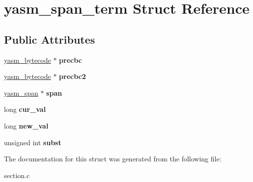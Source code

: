 \hypertarget{structyasm__span__term}{\section{yasm\-\_\-span\-\_\-term Struct Reference}
\label{structyasm__span__term}
}
\subsection*{Public Attributes}
\begin{DoxyCompactItemize}
\item 
\hypertarget{structyasm__span__term_a035f0ab04246f78579bd5672e381a8a3}{\hyperlink{structyasm__bytecode}{yasm\-\_\-bytecode} $\ast$ {\bfseries precbc}}\label{structyasm__span__term_a035f0ab04246f78579bd5672e381a8a3}

\item 
\hypertarget{structyasm__span__term_af9f81cf28035ac6cbf61603e44002f26}{\hyperlink{structyasm__bytecode}{yasm\-\_\-bytecode} $\ast$ {\bfseries precbc2}}\label{structyasm__span__term_af9f81cf28035ac6cbf61603e44002f26}

\item 
\hypertarget{structyasm__span__term_afc7d0fb8ad6277998002f1f3b43ba578}{\hyperlink{structyasm__span}{yasm\-\_\-span} $\ast$ {\bfseries span}}\label{structyasm__span__term_afc7d0fb8ad6277998002f1f3b43ba578}

\item 
\hypertarget{structyasm__span__term_a5439a7ce2a9aab9ccf2dae16dbe3db1e}{long {\bfseries cur\-\_\-val}}\label{structyasm__span__term_a5439a7ce2a9aab9ccf2dae16dbe3db1e}

\item 
\hypertarget{structyasm__span__term_a903220e0c5551293fd5a84dfd98ef204}{long {\bfseries new\-\_\-val}}\label{structyasm__span__term_a903220e0c5551293fd5a84dfd98ef204}

\item 
\hypertarget{structyasm__span__term_a916ee60599ce231fbb5b2a6aad1eb9b6}{unsigned int {\bfseries subst}}\label{structyasm__span__term_a916ee60599ce231fbb5b2a6aad1eb9b6}

\end{DoxyCompactItemize}


The documentation for this struct was generated from the following file\-:\begin{DoxyCompactItemize}
\item 
section.\-c\end{DoxyCompactItemize}
